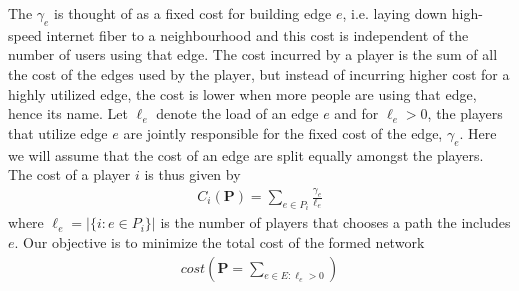 \documentclass[a4paper,10pt]{article}
\theoremstyle{definition}
\newtheorem{defn}[thm]{Definition}
\begin{document}
The $\gamma_e$ is thought of as a fixed cost for building edge $e$, i.e. laying down high-speed internet fiber to a neighbourhood and this cost is independent of the number of users using that edge. The cost incurred by a player is the sum of all the cost of the edges used by the player, but instead of incurring higher cost for a highly utilized edge, the cost is lower when more people are using that edge, hence its name. Let $\ell_e$ denote the load of an edge $e$ and for $\ell_e>0$, the players that utilize edge $e$ are jointly responsible for the fixed cost of the edge, $\gamma_e$. Here we will assume that the cost of an edge are split equally amongst the players. The cost of a player $i$ is thus given by
\begin{align*}
C_i(\mathbf{P})=\sum_{e\in P_i}\frac{\gamma_e}{\ell_e}
\end{align*}
where $\ell_e=|\{i:e \in P_i\}|$ is the number of players that chooses a path the includes $e$. Our objective is to minimize the total cost of the formed network
\begin{align*}
cost(\mathbf{P}=\sum_{e\in E:\ell_e>0}^{})
\end{align*}


\end{document}
